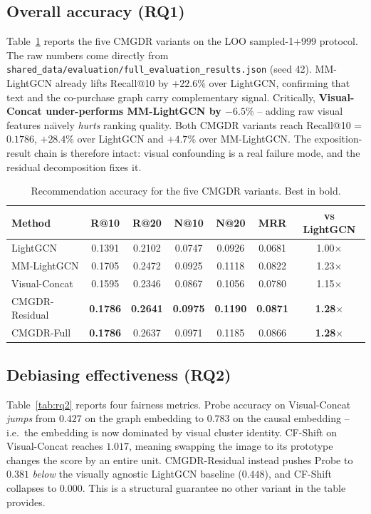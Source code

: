 \documentclass[12pt,a4paper]{article}
\begin{document}
\subsection{Overall accuracy (RQ1)}
Table~\ref{tab:rq1} reports the five CMGDR variants on the LOO sampled-1+999 protocol.
The raw numbers come directly from \texttt{shared\_data/evaluation/full\_evaluation\_results.json}
(seed 42). MM-LightGCN already lifts Recall@10 by $+22.6\%$ over LightGCN, confirming
that text and the co-purchase graph carry complementary signal. Critically,
\textbf{Visual-Concat under-performs MM-LightGCN by $-6.5\%$} -- adding raw visual
features na\"{\i}vely \emph{hurts} ranking quality. Both CMGDR variants reach
Recall@10 = $0.1786$, $+28.4\%$ over LightGCN and $+4.7\%$ over MM-LightGCN. The
exposition-result chain is therefore intact: visual confounding is a real failure mode,
and the residual decomposition fixes it.

\begin{table}[h]
\centering\small
\begin{tabular}{lcccccc}
\toprule
Method            & R@10   & R@20   & N@10   & N@20   & MRR    & vs LightGCN \\
\midrule
LightGCN          & 0.1391 & 0.2102 & 0.0747 & 0.0926 & 0.0681 & 1.00$\times$ \\
MM-LightGCN       & 0.1705 & 0.2472 & 0.0925 & 0.1118 & 0.0822 & 1.23$\times$ \\
Visual-Concat     & 0.1595 & 0.2346 & 0.0867 & 0.1056 & 0.0780 & 1.15$\times$ \\
CMGDR-Residual    & \textbf{0.1786} & \textbf{0.2641} & \textbf{0.0975} & \textbf{0.1190} & \textbf{0.0871} & \textbf{1.28$\times$} \\
CMGDR-Full        & \textbf{0.1786} & 0.2637 & 0.0971 & 0.1185 & 0.0866 & \textbf{1.28$\times$} \\
\bottomrule
\end{tabular}
\caption{Recommendation accuracy for the five CMGDR variants. Best in bold.}
\label{tab:rq1}
\end{table}

\subsection{Debiasing effectiveness (RQ2)}
Table~\ref{tab:rq2} reports four fairness metrics. Probe accuracy on Visual-Concat
\emph{jumps} from $0.427$ on the graph embedding to $0.783$ on the causal embedding --
i.e.\ the embedding is now dominated by visual cluster identity. CF-Shift on
Visual-Concat reaches $1.017$, meaning swapping the image to its prototype changes the
score by an entire unit. CMGDR-Residual instead pushes Probe to $0.381$
\emph{below} the visually agnostic LightGCN baseline ($0.448$), and CF-Shift collapses
to $0.000$. This is a structural guarantee no other variant in the table provides.
\end{document}
